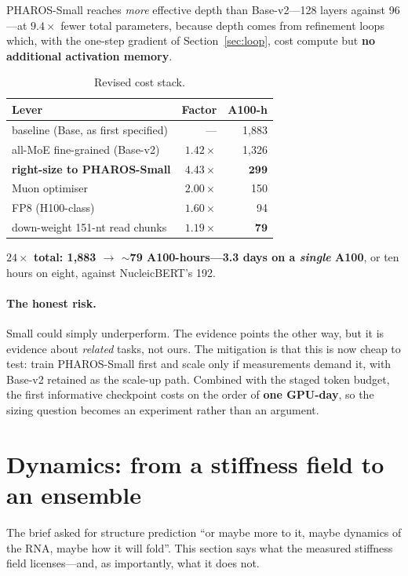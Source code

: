 \documentclass[11pt,a4paper]{article}
\begin{document}
\noindent PHAROS-Small reaches \emph{more} effective depth than Base-v2---128
layers against 96---at $9.4\times$ fewer total parameters, because depth comes
from refinement loops which, with the one-step gradient of
Section~\ref{sec:loop}, cost compute but \textbf{no additional activation
memory}.

\begin{table}[h]
\centering
\caption{Revised cost stack.}
\small
\begin{tabular}{@{}lrr@{}}
\toprule
\textbf{Lever} & \textbf{Factor} & \textbf{A100-h} \\
\midrule
baseline (Base, as first specified) & --- & 1{,}883 \\
all-MoE fine-grained (Base-v2) & $1.42\times$ & 1{,}326 \\
\textbf{right-size to PHAROS-Small} & $\mathbf{4.43\times}$ & $\mathbf{299}$ \\
Muon optimiser & $2.00\times$ & 150 \\
FP8 (H100-class) & $1.60\times$ & 94 \\
down-weight 151-nt read chunks & $1.19\times$ & $\mathbf{79}$ \\
\bottomrule
\end{tabular}
\end{table}

\noindent\textbf{$24\times$ total: 1{,}883 $\rightarrow$ $\sim$79
A100-hours---3.3 days on a \emph{single} A100}, or ten hours on eight, against
NucleicBERT's 192.

\paragraph{The honest risk.} Small could simply underperform. The evidence points
the other way, but it is evidence about \emph{related} tasks, not ours. The
mitigation is that this is now cheap to test: train PHAROS-Small first and scale
only if measurements demand it, with Base-v2 retained as the scale-up path.
Combined with the staged token budget, the first informative checkpoint costs on
the order of \textbf{one GPU-day}, so the sizing question becomes an experiment
rather than an argument.

\section{Dynamics: from a stiffness field to an ensemble}
\label{sec:dyn}

The brief asked for structure prediction ``or maybe more to it, maybe dynamics of
the RNA, maybe how it will fold''. This section says what the measured stiffness
field licenses---and, as importantly, what it does not.
\end{document}
